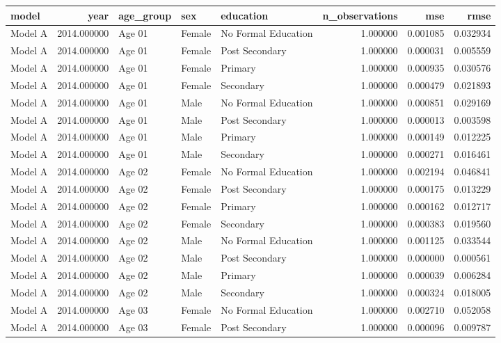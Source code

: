 \begin{table}[ht]
\centering
\begin{tabular}{lrlllrrr}
\hline
model & year & age_group & sex & education & n_observations & mse & rmse \\
\hline
Model A & 2014.000000 & Age 01 & Female & No Formal Education & 1.000000 & 0.001085 & 0.032934 \\
Model A & 2014.000000 & Age 01 & Female & Post Secondary & 1.000000 & 0.000031 & 0.005559 \\
Model A & 2014.000000 & Age 01 & Female & Primary & 1.000000 & 0.000935 & 0.030576 \\
Model A & 2014.000000 & Age 01 & Female & Secondary & 1.000000 & 0.000479 & 0.021893 \\
Model A & 2014.000000 & Age 01 & Male & No Formal Education & 1.000000 & 0.000851 & 0.029169 \\
Model A & 2014.000000 & Age 01 & Male & Post Secondary & 1.000000 & 0.000013 & 0.003598 \\
Model A & 2014.000000 & Age 01 & Male & Primary & 1.000000 & 0.000149 & 0.012225 \\
Model A & 2014.000000 & Age 01 & Male & Secondary & 1.000000 & 0.000271 & 0.016461 \\
Model A & 2014.000000 & Age 02 & Female & No Formal Education & 1.000000 & 0.002194 & 0.046841 \\
Model A & 2014.000000 & Age 02 & Female & Post Secondary & 1.000000 & 0.000175 & 0.013229 \\
Model A & 2014.000000 & Age 02 & Female & Primary & 1.000000 & 0.000162 & 0.012717 \\
Model A & 2014.000000 & Age 02 & Female & Secondary & 1.000000 & 0.000383 & 0.019560 \\
Model A & 2014.000000 & Age 02 & Male & No Formal Education & 1.000000 & 0.001125 & 0.033544 \\
Model A & 2014.000000 & Age 02 & Male & Post Secondary & 1.000000 & 0.000000 & 0.000561 \\
Model A & 2014.000000 & Age 02 & Male & Primary & 1.000000 & 0.000039 & 0.006284 \\
Model A & 2014.000000 & Age 02 & Male & Secondary & 1.000000 & 0.000324 & 0.018005 \\
Model A & 2014.000000 & Age 03 & Female & No Formal Education & 1.000000 & 0.002710 & 0.052058 \\
Model A & 2014.000000 & Age 03 & Female & Post Secondary & 1.000000 & 0.000096 & 0.009787 \\

\end{tabular}
\end{table}
